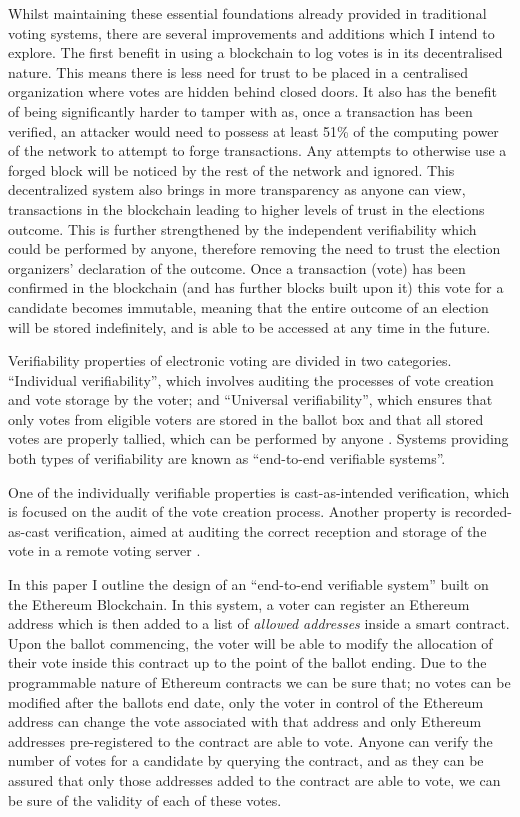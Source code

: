 \documentclass{article}
\begin{document}
Whilst maintaining these essential foundations already provided in traditional voting systems, there are several improvements and additions which I intend to explore. The first benefit in using a blockchain to log votes is in its decentralised nature. This means there is less need for trust to be placed in a centralised organization where votes are hidden behind closed doors. It also has the benefit of being significantly harder to tamper with as, once a transaction has been verified, an attacker would need to possess at least 51\% of the computing power of the network to attempt to forge transactions. Any attempts to otherwise use a forged block will be noticed by the rest of the network and ignored. This decentralized system also brings in more transparency as anyone can view, transactions in the blockchain leading to higher levels of trust in the elections outcome. This is further strengthened by the independent verifiability which could be performed by anyone, therefore removing the need to trust the election organizers' declaration of the outcome. Once a transaction (vote) has been confirmed in the blockchain (and has further blocks built upon it) this vote for a candidate becomes immutable, meaning that the entire outcome of an election will be stored indefinitely, and is able to be accessed at any time in the future.

Verifiability properties of electronic voting are divided in two categories. ``Individual verifiability'', which involves auditing the processes of vote creation and vote storage by the voter; and ``Universal verifiability'', which ensures that only votes from eligible voters are stored in the ballot box and that all stored votes are properly tallied, which can be performed by anyone \citep{49_escala_guasch_herranz_morillo_2015}. Systems providing both types of verifiability are known as ``end-to-end verifiable systems''.

One of the individually verifiable properties is cast-as-intended verification, which is focused on the audit of the vote creation process. Another property is recorded-as-cast verification, aimed at auditing the correct reception and storage of the vote in a remote voting server \citep{49_escala_guasch_herranz_morillo_2015}.


In this paper I outline the design of an ``end-to-end verifiable system'' built on the Ethereum Blockchain. In this system, a voter can register an Ethereum address which is then added to a list of \textit{allowed addresses} inside a smart contract. Upon the ballot commencing, the voter will be able to modify the allocation of their vote inside this contract up to the point of the ballot ending. Due to the programmable nature of Ethereum contracts we can be sure that; no votes can be modified after the ballots end date, only the voter in control of the Ethereum address can change the vote associated with that address and only Ethereum addresses pre-registered to the contract are able to vote. Anyone can verify the number of votes for a candidate by querying the contract, and as they can be assured that only those addresses added to the contract are able to vote, we can be sure of the validity of each of these votes. 

\end{document}
